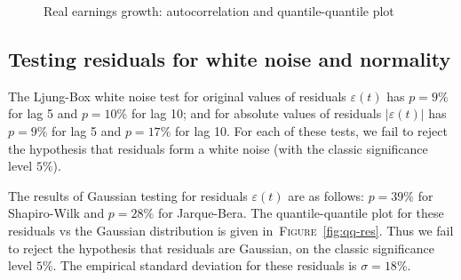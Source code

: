\documentclass[12pt]{amsart}
\theoremstyle{definition}
\begin{document}
\begin{figure}[t]
\caption{Real earnings growth: autocorrelation and quantile-quantile plot}
\label{fig:growth}
\end{figure}


\subsection{Testing residuals for white noise and normality} The Ljung-Box white noise test for original values of residuals $\varepsilon(t)$ has $p = 9\%$ for lag 5 and $p = 10\%$ for lag 10; and for absolute values of residuals $|\varepsilon(t)|$ has $p = 9\%$ for lag 5 and $p = 17\%$ for lag 10. For each of these tests, we fail to reject the hypothesis that residuals form a white noise (with the classic significance level $5\%$). 

The results of Gaussian testing for residuals $\varepsilon(t)$ are as follows: $p = 39\%$ for Shapiro-Wilk and $p = 28\%$ for Jarque-Bera. The quantile-quantile plot for these residuals vs the Gaussian distribution is given in~\textsc{Figure}~\ref{fig:qq-res}. Thus we fail to reject the hypothesis that residuals are Gaussian, on the classic significance level $5\%$. The empirical standard deviation for these residuals is $\sigma = 18\%$. 
\end{document}
